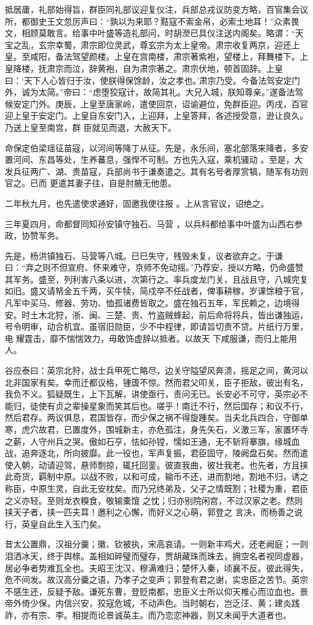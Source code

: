 \documentclass{article}
\begin{document}
\newpage
抵居庸，礼部始得旨，群臣同礼部议迎复仪注，兵部总戎议防变方略，百官集会议所，都御史王文忽厉声曰：“孰以为来耶？黠寇不索金帛，必索土地耳！”众素畏文，相顾莫敢言。给事中叶盛等造礼部问，时胡濙已具仪注送内阁矣。略谓：“天宝之乱，玄宗幸蜀，肃宗即位灵武，尊玄宗为太上皇帝。肃宗收复两京，迎还上皇。至咸阳，备法驾望颜楼。上皇在宫南楼，肃宗著紫袍，望楼上，拜舞楼下。上皇降楼，抚肃宗而泣，辞黄袍，自为肃宗著之。肃宗伏地，顿首固辞。上皇曰：‘天下人心皆归于汝，使朕得保馀龄，汝之孝也。’肃宗乃受。今备法驾安定门外，诚为太简。”帝曰：“虑堕狡寇计，故简其礼。大兄入城，朕知尊亲。”遂备法驾候安定门外。庚辰，上皇至唐家岭，遣使回京，诏谕避位，免群臣迎。丙戌，百官迎上皇于安定门。上皇自东安门入，上迎拜，上皇答拜，各述授受意，逊让良久。乃送上皇至南宫，群
臣就见而退，大赦天下。 

命保定伯梁瑶征苗寇，以河间等降丁从征。先是，永乐间，塞北部落来降者，多安置河间、东昌等处，生养蕃息，强悍不可制。方也先入寇，乘机骚动
\newpage
。至是，大发兵征两广、湖、贵苗寇，兵部尚书于谦奏遣之。其有名号者厚赏犒，随军有功则官之。已而
更遣其妻子往，自是肘腋无他患。 

二年秋九月，也先遣使求通好，固邀我使往报
。上从言官议，诏绝之。 

三年夏四月，命都督同知孙安镇守独石、马营
，以兵科都给事中叶盛为山西右参政，协赞军务。 

先是，杨洪镇独石、马营等八城。已巳失守，残毁未复，议者欲弃之。于谦曰：“弃之则不但宣府、怀来难守，京师不免动摇。”乃荐安，授以方略，仍命盛赞其军务。盛至，列利害八条以进，次第行之。率兵度龙门关，且战且守，八城完复如旧。盛又请帑金五千两，买牛犊，简戍卒不任战者，俾事耕稼，岁课馀粮于官，凡军中买马、修器、劳功、恤孤诸费皆取之。盛在独石五年，军民赖之，边境得安。时土木北狩，浙、闽、三楚、贵、竹盗贼蜂起，前后命将将兵，皆出谦独运，号令明审，动合机宜。虽宿旧勋臣，少不中程律，即请旨切责不贷。片纸行万里，电
\newpage
耀霆击，靡不惴惴效力，毋敢饰虚辞以抵者。以故天
下咸服谦，而归上能用人。 

谷应泰曰：英宗北狩，战士兵甲死亡略尽，边关守隘望风奔溃，摇足之间，黄河以北非国家有矣。幸而迁都议格，锺簴不惊。然而君父叩关，臣子拒敌，彼出有名，我负不义。狐疑既生，上下瓦解，讲使亟行，责问无已。长安必不可守，英宗必不能归，徒使有贞之辈操星象而笑其后也。嗟乎！南迁不行，然后国存；和议不行，然后君存。两议俱息，君国皆存，而少保之祸不得旋踵矣。当夫北兵四合，守御单寒，虎穴故君，已置度外，围城新主，亦危孤注，身先矢石，义激三军，家置环寺之薪，人守州兵之哭。傲如石亨，怯如孙镗，懦如王通，无不斩将搴旗，缘城血战，追奔逐北，所向披靡。此一役也，军声复振，君臣固守，陵阙盘石矣。然而遣使入朝，动请迎驾，悬师剽掠，辄托回銮。彼直我曲，彼壮我老。也先者，方且挟此奇货，羁制中原。以战不败，以和可成，输币不还，进而割地，割地不归，诱之称臣，中原生灵，自此无安枕矣。而乃兄终弟及，父子之情既割；社稷为重，君臣之义亦轻。至则龙衣糗食，敬输橐𫗴
\newpage
之忱；归亦别院闲宫，不过汉家之老。然则挟天子者，挟一匹夫耳！邀利之心懈，而好义之心萌，郭登之
言决，而杨善之说行，英皇自此生入玉门矣。 

昔太公置鼎，汉祖分羹；徽、钦被执，宋高哀请。一则新丰鸡犬，还老阙庭；一则泪洒冰天，终于舆榇。盖相如碎璧而璧存，贾胡藏珠而珠去，拥空名者视同虚器，居必争者势难瓦全也。夫昭王沈汉，穆满难归；楚怀入秦，顷襄不反。彼此得失，危不间发。故汉高分羹之语，乃孝子之变声；郭登有君之谢，实忠臣之苦节。英宗不感生还，反疑予敌。谦死东曹，登贬南都，忠臣义士所以仰天椎心而泣血也。景帝外倚少保，内信兴安，狡寇危城，不动声色。当时朝右，岂乏汪、黄；建炎践祚，亦有宗、李。相提而论景诚英主。而乃恋恋神器，则又未闻乎大道者也。
\end{document}

